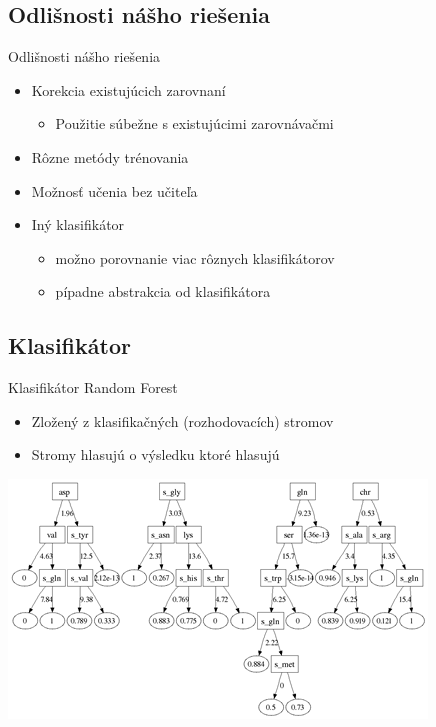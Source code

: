 \documentclass[xcolor=dvipsnames, compress, 12pt]{beamer}
\begin{document}
\subsection{Odlišnosti nášho riešenia}
\begin{frame}{Odlišnosti nášho riešenia}
  \begin{itemize}
    \item Korekcia existujúcich zarovnaní
    \begin{itemize}
      \item Použitie súbežne s existujúcimi zarovnávačmi
    \end{itemize}
    \pause
    \item Rôzne metódy trénovania
    \pause
    \item Možnosť učenia bez učiteľa
    \pause
    \item Iný klasifikátor
    \begin{itemize}
      \item možno porovnanie viac rôznych klasifikátorov
      \item pípadne abstrakcia od klasifikátora
    \end{itemize} 
  \end{itemize} 
\end{frame}

\subsection{Klasifikátor}
\begin{frame}{Klasifikátor}
Random Forest
  \begin{itemize}
    \item Zložený z klasifikačných (rozhodovacích) stromov
    \item Stromy hlasujú o výsledku ktoré hlasujú
  \end{itemize} 
  \vspace{.5cm}
  \begin{center}
  \includegraphics[width=.5\textwidth]{images/random_forest_thumb.png}
  \end{center}
\end{frame}
\end{document}
